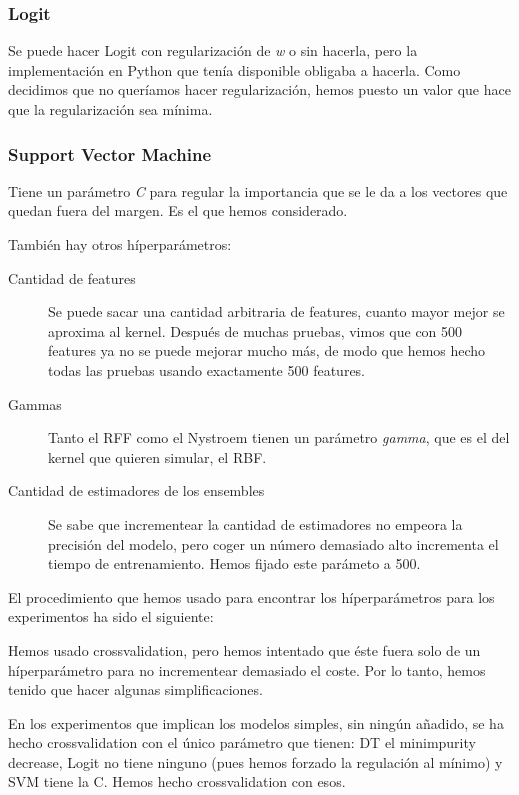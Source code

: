 \subsubsection*{Logit}
Se puede hacer Logit con regularización de \textit{w} o sin hacerla, pero la
implementación en Python que tenía disponible obligaba a hacerla. Como decidimos
que no queríamos hacer regularización, hemos puesto un valor que hace que la
regularización sea mínima.

\subsubsection*{Support Vector Machine}

Tiene un parámetro \textit{C} para regular la importancia que se le da a los
vectores que quedan fuera del margen. Es el que hemos considerado.

También hay otros híperparámetros:

\begin{description}
  \item[Cantidad  de features] Se puede sacar una cantidad arbitraria de
  features, cuanto mayor mejor se aproxima al kernel. Después de muchas pruebas,
  vimos que con 500 features ya no se puede mejorar mucho más, de modo que
  hemos hecho todas las pruebas usando exactamente 500 features.
  \item[Gammas] Tanto el RFF como el Nystroem tienen un parámetro \textit{gamma},
  que es el del kernel que quieren simular, el RBF.
  \item[Cantidad de estimadores de los ensembles] Se sabe que incrementear la
  cantidad de estimadores no empeora la precisión del modelo, pero coger un
  número demasiado alto incrementa el tiempo de entrenamiento. Hemos fijado
  este parámeto a 500.
\end{description}

El procedimiento que hemos usado para encontrar los híperparámetros para los
experimentos ha sido el siguiente:

Hemos usado crossvalidation, pero hemos intentado que éste fuera solo de un
híperparámetro para no incrementear demasiado el coste. Por lo tanto, hemos
tenido que hacer algunas simplificaciones.

En los experimentos que implican los modelos simples, sin ningún añadido, se
ha hecho crossvalidation con el único parámetro que tienen: DT el min\tu impurity
\tu decrease, Logit no tiene ninguno (pues hemos forzado la regulación al
mínimo) y SVM tiene la C. Hemos hecho crossvalidation con esos.

